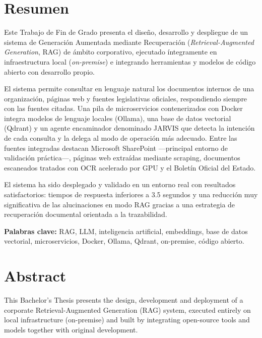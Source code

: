 \chapter*{Resumen}

Este Trabajo de Fin de Grado presenta el diseño, desarrollo y despliegue de un sistema de Generación Aumentada mediante Recuperación (\textit{Retrieval-Augmented Generation}, RAG) de ámbito corporativo, ejecutado íntegramente en infraestructura local (\textit{on-premise}) e integrando herramientas y modelos de código abierto con desarrollo propio.

El sistema permite consultar en lenguaje natural los documentos internos de una organización, páginas web y fuentes legislativas oficiales, respondiendo siempre con las fuentes citadas. Una pila de microservicios contenerizados con Docker integra modelos de lenguaje locales (Ollama), una base de datos vectorial (Qdrant) y un agente encaminador denominado JARVIS que detecta la intención de cada consulta y la delega al modo de operación más adecuado. Entre las fuentes integradas destacan Microsoft SharePoint ---principal entorno de validación práctica---, páginas web extraídas mediante scraping, documentos escaneados tratados con OCR acelerado por GPU y el Boletín Oficial del Estado.

El sistema ha sido desplegado y validado en un entorno real con resultados satisfactorios: tiempos de respuesta inferiores a 3.5 segundos y una reducción muy significativa de las alucinaciones en modo RAG gracias a una estrategia de recuperación documental orientada a la trazabilidad.

\vspace{0.5cm}
\noindent\textbf{Palabras clave:} RAG, LLM, inteligencia artificial, embeddings, base de datos vectorial, microservicios, Docker, Ollama, Qdrant, on-premise, código abierto.

\newpage

\chapter*{Abstract}

This Bachelor's Thesis presents the design, development and deployment of a corporate Retrieval-Augmented Generation (RAG) system, executed entirely on local infrastructure (on-premise) and built by integrating open-source tools and models together with original development.

